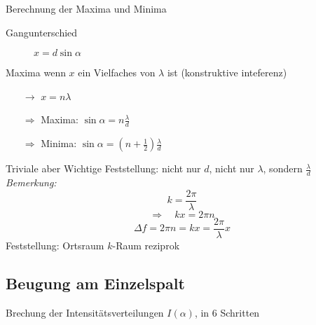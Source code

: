 \documentclass[titlepage,11pt,a4paper,ngerman]{report}
\begin{document}
Berechnung der Maxima und Minima
\begin{description}
	\item[Gangunterschied] $x = d \sin \alpha$
\end{description}
Maxima wenn $x$ ein Vielfaches von $\lambda$ ist (konstruktive inteferenz)
\begin{itemize}
	\item[$\rightarrow$] $x = n \lambda$
	\item[$\Rightarrow$] Maxima: $\sin\alpha = n \frac{\lambda}{d}$
	\item[$\Rightarrow$] Minima: $\sin\alpha = \left(n + \frac{1}{2}\right)\frac{\lambda}{d}$
\end{itemize}

Triviale aber Wichtige Feststellung: nicht nur $d$, nicht nur $\lambda$, sondern $\frac{\lambda}{d}$\\
\emph{Bemerkung: } $$k= \frac{2\pi}{\lambda}$$
$$\Rightarrow \quad kx = 2 \pi n$$
$$\Delta f = 2\pi n = kx = \frac{2 \pi}{\lambda}x$$
Feststellung: Ortsraum $k$-Raum reziprok 




\subsection{Beugung am Einzelspalt}

Brechung der Intensitätsverteilungen $ I(\alpha) $, in 6 Schritten
\end{document}

